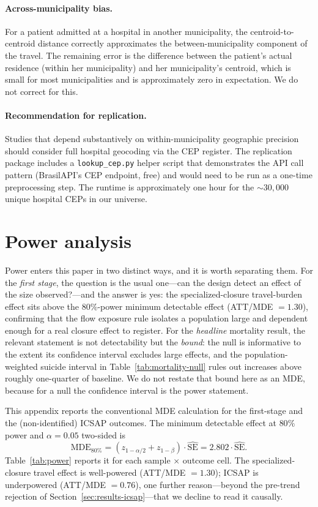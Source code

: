\paragraph{Across-municipality bias.} For a patient admitted at a
hospital in another municipality, the centroid-to-centroid distance
correctly approximates the between-municipality component of the
travel. The remaining error is the difference between the patient's
actual residence (within her municipality) and her municipality's
centroid, which is small for most municipalities and is
approximately zero in expectation. We do not correct for this.

\paragraph{Recommendation for replication.} Studies that depend
substantively on within-municipality geographic precision should
consider full hospital geocoding via the CEP register. The replication
package includes a \texttt{lookup\_cep.py} helper script that
demonstrates the API call pattern (BrasilAPI's CEP endpoint, free)
and would need to be run as a one-time preprocessing step. The runtime
is approximately one hour for the $\sim 30{,}000$ unique hospital
CEPs in our universe.

\section{Power analysis}
\label{app:power}

Power enters this paper in two distinct ways, and it is worth separating
them. For the \emph{first stage}, the question is the usual one---can the
design detect an effect of the size observed?---and the answer is yes:
the specialized-closure travel-burden effect sits above the $80\%$-power
minimum detectable effect (ATT/MDE $= 1.30$), confirming that the flow
exposure rule isolates a population large and dependent enough for a real
closure effect to register. For the \emph{headline} mortality result, the
relevant statement is not detectability but the \emph{bound}: the null is
informative to the extent its confidence interval excludes large effects,
and the population-weighted suicide interval in
Table~\ref{tab:mortality-null} rules out increases above roughly
one-quarter of baseline. We do not restate that bound here as an MDE,
because for a null the confidence interval is the power statement.

This appendix reports the conventional MDE calculation for the
first-stage and the (non-identified) ICSAP outcomes. The minimum
detectable effect at $80\%$ power and $\alpha = 0.05$ two-sided is
\[
  \mathrm{MDE}_{80\%} = (z_{1-\alpha/2} + z_{1-\beta}) \cdot
  \widehat{\mathrm{SE}} = 2.802 \cdot \widehat{\mathrm{SE}}.
\]
Table~\ref{tab:power} reports it for each sample $\times$ outcome cell.
The specialized-closure travel effect is well-powered (ATT/MDE $= 1.30$);
ICSAP is underpowered (ATT/MDE $= 0.76$), one further reason---beyond the
pre-trend rejection of Section~\ref{sec:results-icsap}---that we decline
to read it causally.

